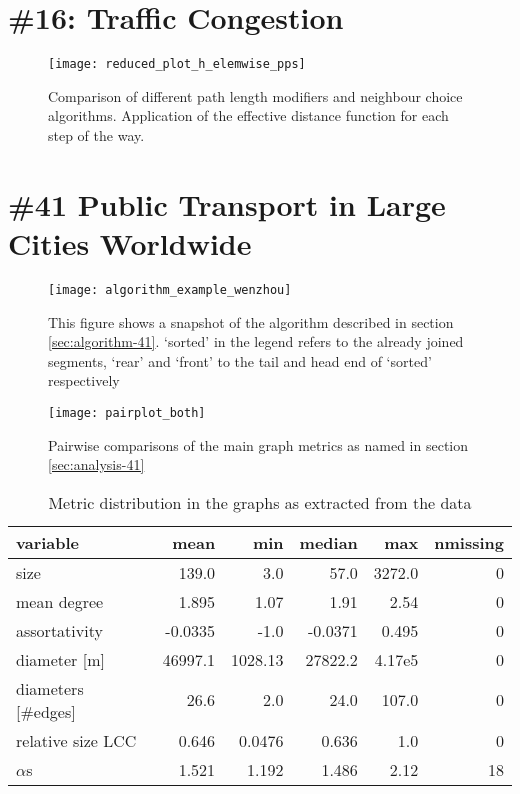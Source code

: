\chapter[Task 16]{\#16: Traffic Congestion}

\begin{figure}[h]
	\centering
	\texttt{[image: reduced\_plot\_h\_elemwise\_pps]}
	\caption{Comparison of different path length modifiers and neighbour choice algorithms. Application of the effective distance function for each step of the way.}
	\label{fig:elemwise-allscaled-16}
\end{figure}


\chapter[Task 41]{\#41 Public Transport in Large Cities Worldwide}
\begin{figure}[h]
	\centering
	\texttt{[image: algorithm\_example\_wenzhou]}
	\caption{\centering This figure shows a snapshot of the algorithm described in section \ref{sec:algorithm-41}. `sorted' in the legend refers to the already joined segments, `rear' and `front' to the tail and head end of `sorted' respectively}
	\label{fig:algorithm-41}
\end{figure}

\begin{figure}[h]
	\centering
	\texttt{[image: pairplot\_both]}
	\caption{Pairwise comparisons of the main graph metrics as named in section \ref{sec:analysis-41}}
	\label{fig:pairplots}
\end{figure}

\begin{table}[h]
	\centering
	\begin{tabular}{lrrrrr}
		\hline
		\textbf{variable} & \textbf{mean} & \textbf{min} & \textbf{median} & \textbf{max} & \textbf{nmissing}  \\\hline
		size & 139.0 & 3.0 & 57.0 & 3272.0 & 0 \\
		mean degree & 1.895 & 1.07 & 1.91 & 2.54 & 0  \\
		assortativity & -0.0335 & -1.0 & -0.0371 & 0.495 & 0 \\
		diameter [\unit{\meter}] & 46997.1 & 1028.13 & 27822.2 & 4.17e5 & 0  \\
		diameters [\#edges] & 26.6 & 2.0 & 24.0 & 107.0 & 0  \\
		relative size LCC & 0.646 & 0.0476 & 0.636 & 1.0 & 0  \\
		$\alpha$s & 1.521 & 1.192 & 1.486 & 2.12 & 18  \\\hline
	\end{tabular}
	\caption{Metric distribution in the graphs as extracted from the data}
\end{table}

